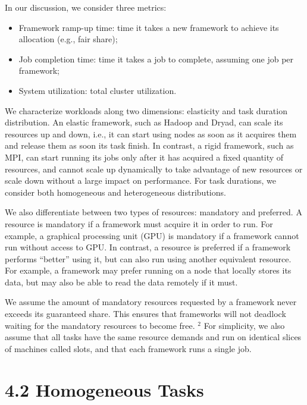 \documentclass[
]{article}
\providecommand{\tightlist}{%
  \setlength{\itemsep}{0pt}\setlength{\parskip}{0pt}}
\begin{document}
In our discussion, we consider three metrics:

\begin{itemize}
\tightlist
\item
  Framework ramp-up time: time it takes a new framework to achieve its
  allocation (e.g., fair share);\\
\item
  Job completion time: time it takes a job to complete, assuming one job
  per framework;\\
\item
  System utilization: total cluster utilization.
\end{itemize}

We characterize workloads along two dimensions: elasticity and task
duration distribution. An elastic framework, such as Hadoop and Dryad,
can scale its resources up and down, i.e., it can start using nodes as
soon as it acquires them and release them as soon its task finish. In
contrast, a rigid framework, such as MPI, can start running its jobs
only after it has acquired a fixed quantity of resources, and cannot
scale up dynamically to take advantage of new resources or scale down
without a large impact on performance. For task durations, we consider
both homogeneous and heterogeneous distributions.

We also differentiate between two types of resources: mandatory and
preferred. A resource is mandatory if a framework must acquire it in
order to run. For example, a graphical processing unit (GPU) is
mandatory if a framework cannot run without access to GPU. In contrast,
a resource is preferred if a framework performs ``better'' using it, but
can also run using another equivalent resource. For example, a framework
may prefer running on a node that locally stores its data, but may also
be able to read the data remotely if it must.

We assume the amount of mandatory resources requested by a framework
never exceeds its guaranteed share. This ensures that frameworks will
not deadlock waiting for the mandatory resources to become free.
\(^{2}\) For simplicity, we also assume that all tasks have the same
resource demands and run on identical slices of machines called slots,
and that each framework runs a single job.

\section{4.2 Homogeneous Tasks}\label{homogeneous-tasks}
\end{document}

